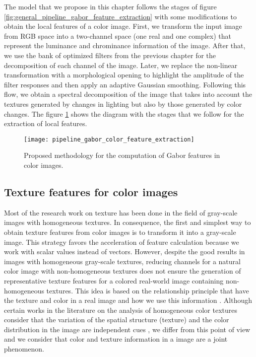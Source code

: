 The model that we propose in this chapter follows the stages of figure \ref{fig:general_pipeline_gabor_feature_extraction} with some modifications to obtain the local features of a color image. First, we transform the input image from RGB space into a two-channel space (one real and one complex) that represent the luminance and chrominance information of the image. After that, we use the bank of optimized filters from the previous chapter for the decomposition of each channel of the image. Later, we replace the non-linear transformation with a morphological opening to highlight the amplitude of the filter responses and then apply an adaptive Gaussian smoothing. Following this flow, we obtain a spectral decomposition of the image that takes into account the textures generated by changes in lighting but also by those generated by color changes. The figure \ref{fig:proposed_pipeline_gabor_feature_extraction} shows the diagram with the stages that we follow for the extraction of local features.

\begin{figure}[!ht]
	\centering
	\texttt{[image: pipeline\_gabor\_color\_feature\_extraction]}
	\caption{Proposed methodology for the computation of Gabor features in color images.}\label{fig:proposed_pipeline_gabor_feature_extraction}
\end{figure}


\subsection{Texture features for color images}
Most of the research work on texture has been done in the field of gray-scale images with homogeneous textures. In consequence, the first and simplest way to obtain texture features from color images is to transform it into a gray-scale image. This strategy favors the acceleration of feature calculation because we work with scalar values instead of vectors. However, despite the good results in images with homogeneous gray-scale textures, reducing channels for a natural color image with non-homogeneous textures does not ensure the generation of representative texture features for a colored real-world image containing non-homogeneous textures. This idea is based on the relationship principle that have the texture and color in a real image and how we use this information \citep{Maenpaa.Pietikainen:PR:2004}. Although certain works in the literature on the analysis of homogeneous color textures consider that the variation of the spatial structure (texture) and the color distribution in the image are independent cues \citep{Permuter.Francos.ea:PR:2006}, we differ from this point of view and we consider that color and texture information in a image are a joint phenomenon.

